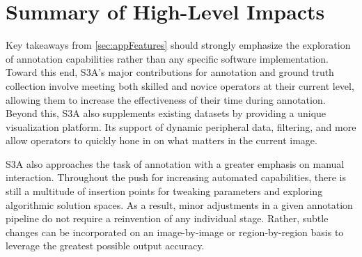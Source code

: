 \section{Summary of High-Level Impacts}\label{sec:impacts}
Key takeaways from \autoref{sec:appFeatures} should strongly emphasize the exploration of annotation capabilities rather than any specific software implementation. Toward this end, S3A's major contributions for annotation and ground truth collection involve meeting both skilled and novice operators at their current level, allowing them to increase the effectiveness of their time during annotation. Beyond this, S3A also supplements existing datasets by providing a unique visualization platform. Its support of dynamic peripheral data, filtering, and more allow operators to quickly hone in on what matters in the current image.

S3A also approaches the task of annotation with a greater emphasis on manual interaction. Throughout the push for increasing automated capabilities, there is still a multitude of insertion points for tweaking parameters and exploring algorithmic solution spaces. As a result, minor adjustments in a given annotation pipeline do not require a reinvention of any individual stage. Rather, subtle changes can be incorporated on an image-by-image or region-by-region basis to leverage the greatest possible output accuracy.